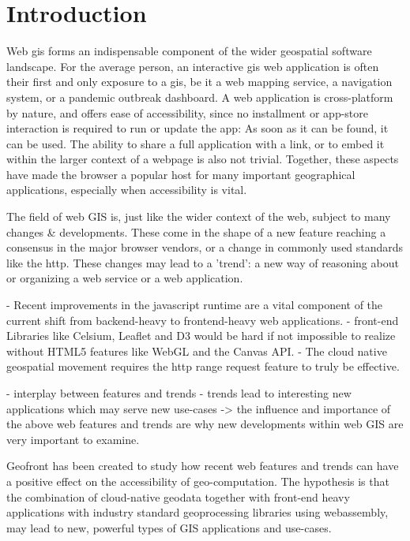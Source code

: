 \chapter{Introduction}
Web \ac{gis} forms an indispensable component of the wider geospatial software landscape. 
For the average person, an interactive \ac{gis} web application is often their first and only exposure to a \acs{gis}, be it a web mapping service, a navigation system, or a pandemic outbreak dashboard. 
A web application is cross-platform by nature, and offers ease of accessibility, since no installment or app-store interaction is required to run or update the app: 
As soon as it can be found, it can be used.
The ability to share a full application with a link, or to embed it within the larger context of a webpage is also not trivial. 
Together, these aspects have made the browser a popular host for many important geographical applications, especially when accessibility is vital.

The field of web GIS is, just like the wider context of the web, subject to many changes \& developments. 
These come in the shape of a new feature reaching a consensus in the major browser vendors, or a change in commonly used standards like the \ac{http}.
These changes may lead to a 'trend': a new way of reasoning about or organizing a web service or a web application.

- Recent improvements in the javascript runtime are a vital component of the current shift from backend-heavy to frontend-heavy web applications. 
- front-end Libraries like Celsium, Leaflet and D3 would be hard if not impossible to realize without HTML5 features like WebGL and the Canvas API.
- The cloud native geospatial movement requires the http range request feature to truly be effective.

- interplay between features and trends 
- trends lead to interesting new applications which may serve new use-cases
-> the influence and importance of the above web features and trends are why new developments within web GIS are very important to examine.



Geofront has been created to study how recent web features and trends can have a positive effect on the accessibility of geo-computation. 
The hypothesis is that the combination of cloud-native geodata together with front-end heavy applications with industry standard geoprocessing libraries using webassembly, may lead to new, powerful types of GIS applications and use-cases. 

